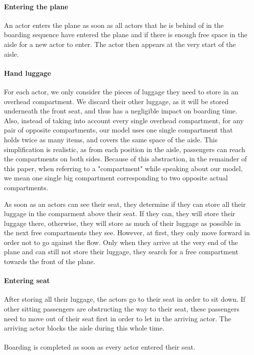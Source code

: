 \documentclass[11pt]{article}
\begin{document}
\paragraph{Entering the plane}
An actor enters the plane as soon as all actors that he is behind of in the boarding sequence  have entered the plane and if there is enough free space in the aisle for a new actor to enter. The actor then appears at the very start of the aisle.


\paragraph{Hand luggage}
For each actor, we only consider the pieces of luggage they need to store in an overhead compartment. We discard their other luggage, as it will be stored underneath the front seat, and thus has a negligible impact on boarding time. Also, instead of taking into account every single overhead compartment, for any pair of opposite compartments, our model uses one single compartment that holds twice as many items, and covers the same space of the aisle. This simplification is realistic, as from each position in the aisle, passengers can reach the compartments on both sides. Because of this abstraction, in the remainder of this paper, when referring to a "compartment" while speaking about our model, we mean one single big compartment corresponding to two opposite actual compartments.

	As soon as an actors can see their seat, they determine if they can store all their luggage in the comparment above their seat. If they can, they will store their luggage there, otherwise, they will store as much of their luggage as possible in the next free compartments they see. However, at first, they only move forward in order not to go against the flow. Only when they arrive at the very end of the plane and can still not store their luggage, they search for a free compartment towards the front of the plane.


\paragraph{Entering seat}
After storing all their luggage, the actors go to their seat in order to sit down. If other sitting passengers are obstructing the way to their seat, these passengers need to move out of their seat first in order to let in the arriving actor. The arriving actor blocks the aisle during this whole time.
\\\\
Boarding is completed as soon as every actor entered their seat.
\end{document}
